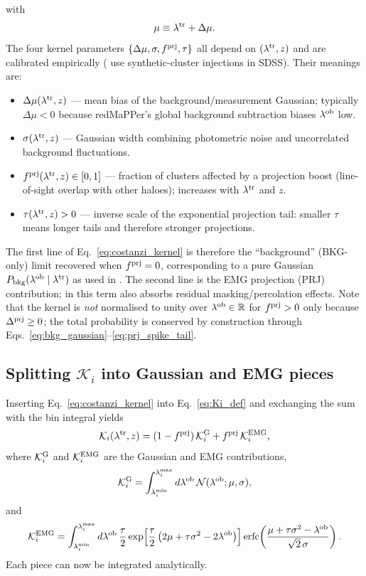 \documentclass[a4paper, 11pt]{article}
\newcommand{\ltr}{\lambda^{\rm tr}}
\newcommand{\lob}{\lambda^{\rm ob}}
\begin{document}
with
\begin{equation}
\mu \equiv \ltr + \Delta\mu.
\label{eq:mu_def}
\end{equation}
The four kernel parameters $\{\Delta\mu,\sigma,f^{\rm prj},\tau\}$ all depend on $(\ltr,z)$ and are calibrated empirically (\citealt{Costanzi2019proj} use synthetic-cluster injections in SDSS). Their meanings are:
\begin{itemize}
\item $\Delta\mu(\ltr,z)$ --- mean bias of the background/measurement Gaussian; typically $\Delta\mu<0$ because redMaPPer's global background subtraction biases $\lob$ low.
\item $\sigma(\ltr,z)$ --- Gaussian width combining photometric noise and uncorrelated background fluctuations.
\item $f^{\rm prj}(\ltr,z)\in[0,1]$ --- fraction of clusters affected by a projection boost (line-of-sight overlap with other haloes); increases with $\ltr$ and $z$.
\item $\tau(\ltr,z)>0$ --- inverse scale of the exponential projection tail: smaller $\tau$ means longer tails and therefore stronger projections.
\end{itemize}
The first line of Eq.~\eqref{eq:costanzi_kernel} is therefore the ``background'' (BKG-only) limit recovered when $f^{\rm prj}=0$, corresponding to a pure Gaussian $P_{\rm bkg}(\lob\mid\ltr)$ as used in \citet{Costanzi2021}. The second line is the EMG projection (PRJ) contribution; in \citet{Costanzi2021} this term also absorbs residual masking/percolation effects. Note that the kernel is \emph{not} normalised to unity over $\lob\in\mathbb R$ for $f^{\rm prj}>0$ only because $\Delta^{\rm prj}\ge 0$; the total probability is conserved by construction through Eqs.~\eqref{eq:bkg_gaussian}--\eqref{eq:prj_spike_tail}.

\subsection{Splitting $\mathcal K_i$ into Gaussian and EMG pieces}

Inserting Eq.~\eqref{eq:costanzi_kernel} into Eq.~\eqref{eq:Ki_def} and exchanging the sum with the bin integral yields
\begin{equation}
\mathcal K_i(\ltr,z)
=
(1-f^{\rm prj})\,\mathcal K_i^{\rm G}
+
f^{\rm prj}\,\mathcal K_i^{\rm EMG},
\label{eq:Ki_split}
\end{equation}
where $\mathcal K_i^{\rm G}$ and $\mathcal K_i^{\rm EMG}$ are the Gaussian and EMG contributions,
\begin{equation}
\mathcal K_i^{\rm G}
=
\int_{\lambda_i^{\min}}^{\lambda_i^{\max}}
d\lob\,
\mathcal N(\lob;\mu,\sigma),
\end{equation}
and
\begin{equation}
\mathcal K_i^{\rm EMG}
=
\int_{\lambda_i^{\min}}^{\lambda_i^{\max}}
d\lob\,
\frac{\tau}{2}
\exp\!\left[
\frac{\tau}{2}\left(2\mu+\tau\sigma^2-2\lob\right)
\right]
\operatorname{erfc}\!\left(
\frac{\mu+\tau\sigma^2-\lob}{\sqrt{2}\,\sigma}
\right).
\end{equation}
Each piece can now be integrated analytically.
\end{document}

